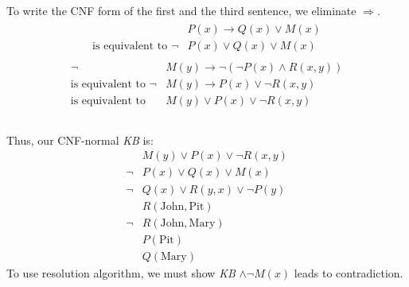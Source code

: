 \documentclass{article}
\begin{document}
   \subsection{}
   To write the CNF form of the first and the third sentence, we eliminate $\Rightarrow$.
   \begin{align*} \begin{split}
        &P(x) \rightarrow Q(x) \vee M(x) \\
        \text{is equivalent to  } \neg &P(x) \vee Q(x) \vee M(x)
    \end{split} \end{align*}
    \medskip
    \begin{align*} \begin{split}
        \neg &M(y) \rightarrow \neg (\neg P(x) \wedge R(x,y)) \\
        \text{is equivalent to  } \neg &M(y) \rightarrow P(x) \vee \neg R(x,y) \\
        \text{is equivalent to  } &M(y) \vee P(x) \vee \neg R(x,y) \\
    \end{split} \end{align*}
    \bigskip
    \\
    Thus, our CNF-normal \textit{KB} is:
    \begin{align*}
        &M(y) \vee P(x) \vee \neg R(x,y) \\
        \neg &P(x) \vee Q(x) \vee M(x) \\
        \neg &Q(x)\vee R(y,x) \vee \neg P(y) \\
        &R(\text{John}, \text{Pit}) \\
        \neg &R(\text{John}, \text{Mary}) \\
        &P(\text{Pit}) \\
        &Q(\text{Mary})
    \end{align*}
    To use resolution algorithm, we must show \textit{KB} $\wedge \neg M(x)$ leads to contradiction.\\
\end{document}
